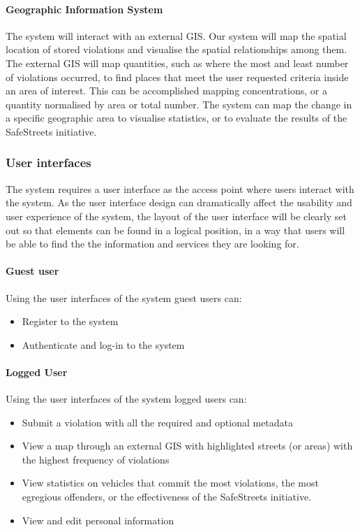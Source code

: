 \paragraph{Geographic Information System} The system will interact with an external GIS. Our system will map the spatial location of stored violations and visualise the spatial relationships among them. The external GIS will map quantities, such as where the most and least number of violations occurred, to find places that meet the user requested criteria inside an area of interest. This can be accomplished mapping concentrations, or a quantity normalised by area or total number. The system can map the change in a specific geographic area to visualise statistics, or to evaluate the results of the SafeStreets initiative.	

\subsubsection{User interfaces}

The system requires a user interface as the access point where users interact with the system. As the user interface design can dramatically affect the usability and user experience of the system, the layout of the user interface will be clearly set out so that elements can be found in a logical position, in a way that users will be able to find the the information and services they are looking for.

\paragraph{Guest user}
	Using the user interfaces of the system guest users can:
	\begin{itemize}
		\item Register to the system
		\item Authenticate and log-in to the system
	\end{itemize}
	
\paragraph{Logged User}
	Using the user interfaces of the system logged users can:
	\begin{itemize}
		\item Submit a violation with all the required and optional metadata
		\item View a map through an external GIS with highlighted streets (or areas) with the highest frequency of violations
		\item View statistics on vehicles that commit the most violations, the most egregious offenders, or the effectiveness of the SafeStreets initiative.
		\item View and edit personal information
	\end{itemize}
		
